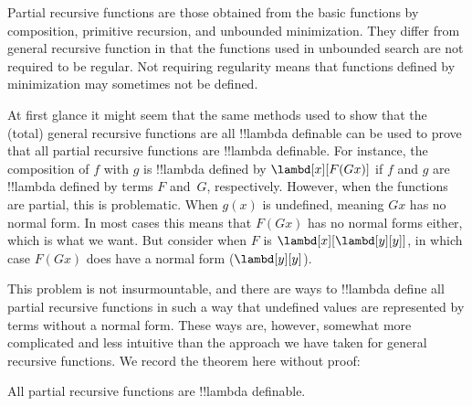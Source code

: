\documentclass[../../../include/open-logic-section]{subfiles}
\begin{document}

Partial recursive functions are those obtained from the basic
functions by composition, primitive recursion, and unbounded
minimization. They differ from general recursive function in that the
functions used in unbounded search are not required to be regular.
Not requiring regularity means that functions defined by minimization
may sometimes not be defined. 

At first glance it might seem that the same methods used to show that
the (total) general recursive functions are all !!{lambda definable} can
be used to prove that all partial recursive functions are
!!{lambda definable}.  For instance, the composition of $f$ with $g$ is
!!{lambda define}d by $\lambd[x][F (G x)]$ if $f$ and $g$ are
!!{lambda define}d by terms $F$ and~$G$, respectively. However, when the
functions are partial, this is problematic. When $g(x)$ is undefined,
meaning $G x$ has no normal form. In most cases this means that $F (G
x)$ has no normal forms either, which is what we want.  But consider
when $F$ is $\lambd[x][\lambd[y][y]]$, in which case $F (G x)$ does
have a normal form ($\lambd[y][y]$). 

This problem is not insurmountable, and there are ways to
!!{lambda define} all partial recursive functions in such a way that
undefined values are represented by terms without a normal form.
These ways are, however, somewhat more complicated and less intuitive
than the approach we have taken for general recursive functions. We
record the theorem here without proof:

\begin{thm}
  All partial recursive functions are !!{lambda definable}.
\end{thm}
\end{document}

